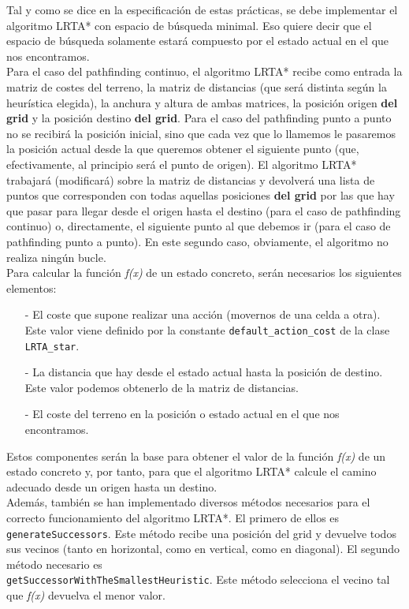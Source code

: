 Tal y como se dice en la especificación de estas prácticas, se debe implementar el algoritmo LRTA* con espacio de búsqueda minimal. Eso quiere decir que el espacio de búsqueda solamente estará compuesto por el estado actual en el que nos encontramos. \\

Para el caso del pathfinding continuo, el algoritmo LRTA* recibe como entrada la matriz de costes del terreno, la matriz de distancias (que será distinta según la heurística elegida), la anchura y altura de ambas matrices, la posición origen \textbf{del grid} y la posición destino \textbf{del grid}. Para el caso del pathfinding punto a punto no se recibirá la posición inicial, sino que cada vez que lo llamemos le pasaremos la posición actual desde la que queremos obtener el siguiente punto (que, efectivamente, al principio será el punto de origen). El algoritmo LRTA* trabajará (modificará) sobre la matriz de distancias y devolverá una lista de puntos que corresponden con todas aquellas posiciones \textbf{del grid} por las que hay que pasar para llegar desde el origen hasta el destino (para el caso de pathfinding continuo) o, directamente, el siguiente punto al que debemos ir (para el caso de pathfinding punto a punto). En este segundo caso, obviamente, el algoritmo no realiza ningún bucle. \\ 

Para calcular la función \textit{f(x)} de un estado concreto, serán necesarios los siguientes elementos:
\begin{itemize}
	\item[-] El coste que supone realizar una acción (movernos de una celda a otra). Este valor viene definido por la constante \texttt{default\_action\_cost} de la clase \texttt{LRTA\_star}.
	\item[-] La distancia que hay desde el estado actual hasta la posición de destino. Este valor podemos obtenerlo de la matriz de distancias.
	\item[-] El coste del terreno en la posición o estado actual en el que nos encontramos.
\end{itemize}

Estos componentes serán la base para obtener el valor de la función \textit{f(x)} de un estado concreto y, por tanto, para que el algoritmo LRTA* calcule el camino adecuado desde un origen hasta un destino. \\

Además, también se han implementado diversos métodos necesarios para el correcto funcionamiento del algoritmo LRTA*. El primero de ellos es \texttt{generateSuccessors}. Este método recibe una posición del grid y devuelve todos sus vecinos (tanto en horizontal, como en vertical, como en diagonal). El segundo método necesario es \\
\texttt{getSuccessorWithTheSmallestHeuristic}. Este método selecciona el vecino tal que \textit{f(x)} devuelva el menor valor.

